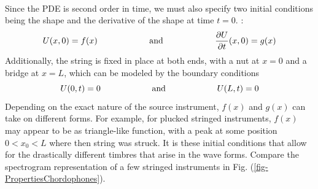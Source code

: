 \documentclass[12pt,letterpaper]{article}
\begin{document}
\paragraph*{}Since the PDE is second order in time, we must also specify two initial conditions being the shape and the derivative of the shape at time $t = 0$.  \cite{Olson,White,Haberman}:
\begin{equation}
U(x,0) = f(x) 
	\text{\hspace*{2cm} and \hspace*{2cm}}
\frac{\partial U}{\partial t}(x,0) = g(x)
\end{equation}
Additionally, the string is fixed in place at both ends, with a nut at $x = 0$ and a bridge at $x = L$, which can be modeled by the boundary conditions
\begin{equation}
U(0,t) = 0 
	\text{\hspace*{2cm} and \hspace*{2cm}}
U(L,t) = 0 
\end{equation}
Depending on the exact nature of the source instrument, $f(x)$ and $g(x)$ can take on different forms. For example, for plucked stringed instruments, $f(x)$ may appear to be as triangle-like function, with a peak at some position $0 < x_0 < L$ where then string was struck. It is these initial conditions that allow for the drastically different timbres that arise in the wave forms. Compare the spectrogram representation of a few stringed instruments in Fig. (\ref{fig-PropertiesChordophones}).
\end{document}
